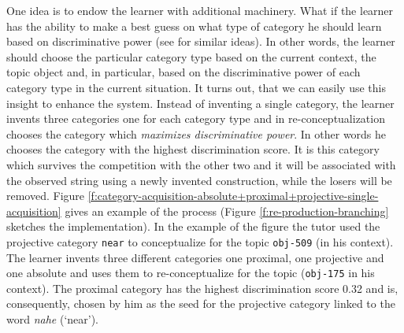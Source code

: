 One idea is to endow the learner with additional machinery.
What if the learner has the ability to make a best guess on 
what type of category he should learn based on discriminative power
(see \citealt{steels1997distinctions} for similar ideas). 
In other words, the learner should choose the particular category type
based on the current context, the topic object and, in particular, based on 
the discriminative power of each category type in the current situation.
It turns out, that we can easily use this insight to enhance the system. 
Instead of inventing a single category, the learner invents three
categories one for each category type and in re-conceptualization chooses
the category which \emph{maximizes discriminative power}.
In other words he chooses the category with the highest discrimination score. 
It is this category which survives the 
competition with the other two and it will be associated with the observed string
using a newly invented construction, while the losers will be removed.
Figure \ref{f:category-acquisition-absolute+proximal+projective-single-acquisition} 
gives an example of the process (Figure \ref{f:re-production-branching} sketches the implementation).
In the example of the figure the tutor used the projective 
category {\footnotesize\tt near} to conceptualize for the topic 
{\footnotesize\tt obj-509} (in his context). The learner invents three 
different categories one proximal, one projective and one absolute and
uses them to re-conceptualize for the topic ({\footnotesize\tt obj-175} in his context). 
The proximal category has the highest discrimination score 0.32 
and is, consequently, chosen by him as the seed for the projective 
category linked to the word \textit{nahe} (`near').

